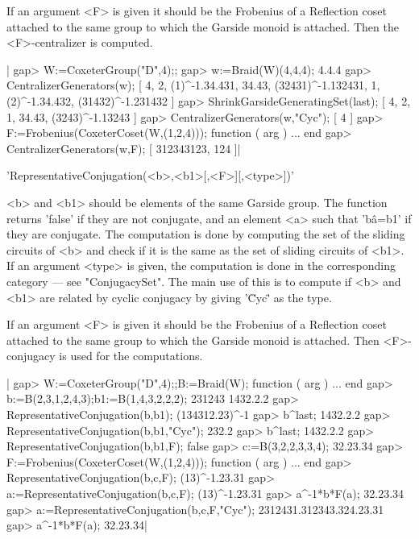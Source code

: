 If  an argument  <F> is  given it  should be  the Frobenius of a Reflection
coset  attached to the same group to  which the Garside monoid is attached.
Then the <F>-centralizer is computed.

|    gap> W:=CoxeterGroup("D",4);;
    gap> w:=Braid(W)(4,4,4);
    4.4.4
    gap> CentralizerGenerators(w);
    [ 4, 2, (1)^-1.34.431, 34.43, (32431)^-1.132431, 1, (2)^-1.34.432,
      (31432)^-1.231432 ]
    gap> ShrinkGarsideGeneratingSet(last);
    [ 4, 2, 1, 34.43, (3243)^-1.13243 ]
    gap> CentralizerGenerators(w,"Cyc");
    [ 4 ]
    gap> F:=Frobenius(CoxeterCoset(W,(1,2,4)));
    function ( arg ) ... end
    gap> CentralizerGenerators(w,F);
    [ 312343123, 124 ]|



'RepresentativeConjugation(<b>,<b1>[,<F>][,<type>])'

<b>  and <b1> should  be elements of  the same Garside  group. The function
returns  'false' if they  are not conjugate,  and an element  <a> such that
'b\^a=b1'  if they are conjugate. The  computation is done by computing the
set  of the sliding circuits of <b> and check  if it is the same as the set
of  sliding  circuits  of  <b1>.  If  an  argument  <type>  is  given,  the
computation  is done in the  corresponding category --- see "ConjugacySet".
The  main use of this is  to compute if <b> and  <b1> are related by cyclic
conjugacy by giving '\"Cyc\"' as the type.

If  an argument  <F> is  given it  should be  the Frobenius of a Reflection
coset  attached to the same group to  which the Garside monoid is attached.
Then <F>-conjugacy is used for the computations.

|    gap> W:=CoxeterGroup("D",4);;B:=Braid(W);
    function ( arg ) ... end
    gap> b:=B(2,3,1,2,4,3);b1:=B(1,4,3,2,2,2);
    231243
    1432.2.2
    gap> RepresentativeConjugation(b,b1);
    (134312.23)^-1
    gap> b^last;
    1432.2.2
    gap> RepresentativeConjugation(b,b1,"Cyc");
    232.2
    gap> b^last;
    1432.2.2
    gap> RepresentativeConjugation(b,b1,F);
    false
    gap> c:=B(3,2,2,3,3,4);
    32.23.34
    gap> F:=Frobenius(CoxeterCoset(W,(1,2,4)));
    function ( arg ) ... end
    gap> RepresentativeConjugation(b,c,F);
    (13)^-1.23.31
    gap> a:=RepresentativeConjugation(b,c,F);
    (13)^-1.23.31
    gap> a^-1*b*F(a);
    32.23.34
    gap> a:=RepresentativeConjugation(b,c,F,"Cyc");
    2312431.312343.324.23.31
    gap> a^-1*b*F(a);
    32.23.34|

